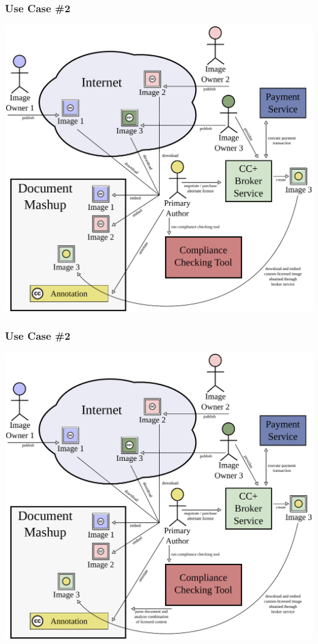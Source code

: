 \documentclass[mathserif,xcolor=dvipsnames,hyperref={bookmarks=true}]{beamer}
\begin{document}
    \begin{frame}[t]
        \frametitle{Use Case \#2}
        \begin{center}
            \includegraphics[width=0.9\textheight]{../resources/usecases/usecase2/usecase2-step38.pdf}
        \end{center}
    \end{frame}
    \begin{frame}[t]
        \frametitle{Use Case \#2}
        \begin{center}
            \includegraphics[width=0.9\textheight]{../resources/usecases/usecase2/usecase2-step39.pdf}
        \end{center}
    \end{frame}
\end{document}
